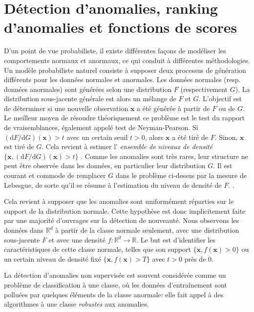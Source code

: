 \documentclass[a4paper, 12pt]{article}
\newcommand{\ud}{\mathrm{d}}
\def\mb{\mathbf}
\def\rset{\mathbb{R}}
\begin{document}
\section{Détection d'anomalies, ranking d'anomalies et fonctions de scores}
\label{resume_fr:scoring_function}
D'un point de vue probabiliste, il existe différentes façons de modéliser les comportements normaux et anormaux, ce qui conduit à différentes méthodologies. Un modèle probabiliste naturel consiste à supposer deux processus de génération différents pour les données normales et anormales. Les données normales (resp. données anormales) sont générées selon une distribution $F$ (respectivement $G$). La distribution sous-jacente générale est alors un mélange de $F$ et $G$. L'objectif est de déterminer si une nouvelle observation $ \mb x $ a été générée à partir de $ F $ ou de $ G $. Le meilleur moyen de résoudre théoriquement ce problème est le test du rapport de vraisemblances, également appelé test de Neyman-Pearson. Si $ (\ud F / \ud G) (\mb x)> t $ avec un certain seuil $ t> 0 $, alors $ \mb x $ a été tiré de $ F $. Sinon, $ \mb x $ est tiré de $ G $. Cela revient à estimer l' \emph{ensemble de niveaux de densité} $ \{\mb x, (\ud F / \ud G) (\mb x)> t \} $ \citep{Scholkopf2001, Steinwart2005, Scott2006, VertVert}.
%
Comme les anomalies sont très rares, leur structure ne peut être observée dans les données, en particulier leur distribution $ G $.
%
Il est courant et commode de remplacer $ G $ dans le problème ci-dessus par la mesure de Lebesgue, de sorte qu'il se résume à l'estimation du niveau de densité de $ F $.
\citep{Scholkopf2001, Scott2006, VertVert}.

Cela revient à supposer que les anomalies sont uniformément réparties sur le support de la distribution normale. %
Cette hypothèse est donc implicitement faite par une majorité d'ouvrages sur la détection de nouveauté.
%
Nous observons les données dans $ \rset ^ d $ à partir de la classe normale seulement, avec une distribution sous-jacente $ F $ et avec une densité $ f: \rset ^ d \to \rset $.
Le but est d'identifier les caractéristiques de cette classe normale, telles que son support $ \{\mb x, f (\mb x)> 0 \} $ ou un certain niveau de densité fixé $ \{\mb x, f (\mb x )> T \} $ avec $ t> 0 $ près de $ 0 $.

La détection d'anomalies non supervisée est souvent considérée comme un problème de classification à une classe, où les données d'entraînement sont polluées par quelques éléments de la classe anormale: elle fait appel à des algorithmes à une classe \emph{robustes} aux anomalies.
\end{document}
